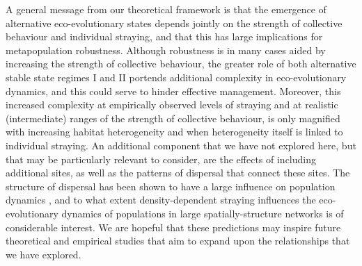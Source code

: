 \documentclass{revtex4}
\begin{document}
A general message from our theoretical framework is that the emergence of alternative eco-evolutionary states depends jointly on the strength of collective behaviour and individual straying, and that this has large implications for metapopulation robustness.
Although robustness is in many cases aided by increasing the strength of collective behaviour, the greater role of both alternative stable state regimes I and II portends additional complexity in eco-evolutionary dynamics, and this could serve to hinder effective management.
Moreover, this increased complexity at empirically observed levels of straying \citep{H:2013fs} and at realistic (intermediate) ranges of the strength of collective behaviour, is only magnified with increasing habitat heterogeneity and when heterogeneity itself is linked to individual straying.
An additional component that we have not explored here, but that may be particularly relevant to consider, are the effects of including additional sites, as well as the patterns of dispersal that connect these sites.
The structure of dispersal has been shown to have a large influence on population dynamics \citep{Heino:1997vf,Carrara:2014cy,Yeakel:2013vz,Gilarranz:2017fs}, and to what extent density-dependent straying influences the eco-evolutionary dynamics of populations in large spatially-structure networks is of considerable interest.
We are hopeful that these predictions may inspire future theoretical and empirical studies that aim to expand upon the relationships that we have explored.
\end{document}
